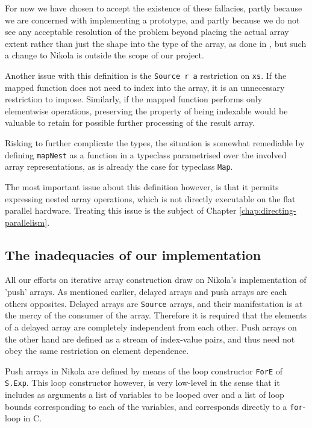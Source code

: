For now we have chosen to accept the existence of these fallacies,
partly because we are concerned with implementing a prototype, and
partly because we do not see any acceptable resolution of the problem
beyond placing the actual array extent rather than just the shape into
the type of the array, as done in \cite{thiemannagda}, but such a
change to Nikola is outside the scope of our project.

Another issue with this definition is the \lstinline{Source r a} restriction on
\lstinline{xs}. If the mapped function does not need to index into the array, it
is an unnecessary restriction to impose.  Similarly, if the mapped function
performs only elementwise operations, preserving the property of being
indexable would be valuable to retain for possible further processing of the
result array.

Risking to further complicate the types, the situation is somewhat remediable
by defining \lstinline{mapNest} as a function in a typeclass parametrised over the
involved array representations, as is already the case for typeclass
\lstinline{Map}.

The most important issue about this definition however, is that it permits
expressing nested array operations, which is not directly executable on the flat
parallel hardware. Treating this issue is the subject of Chapter
\ref{chap:directing-parallelism}.

\subsection{The inadequacies of our implementation}

All our efforts on iterative array construction draw on Nikola's implementation
of 'push' arrays. As mentioned earlier, delayed arrays and push arrays are each
others opposites. Delayed arrays are \lstinline{Source} arrays, and their
manifestation is at the mercy of the consumer of the array. Therefore it is
required that the elements of a delayed array are completely independent from
each other. Push arrays on the other hand are defined as a stream of
index-value pairs, and thus need not obey the same restriction on element
dependence.

Push arrays in Nikola are defined by means of the loop constructor
\lstinline{ForE} of \lstinline{S.Exp}. This loop constructor however, is very
low-level in the sense that it includes as arguments a list of variables to be
looped over and a list of loop bounds corresponding to each of the variables,
and corresponds directly to a \lstinline{for}-loop in C.

